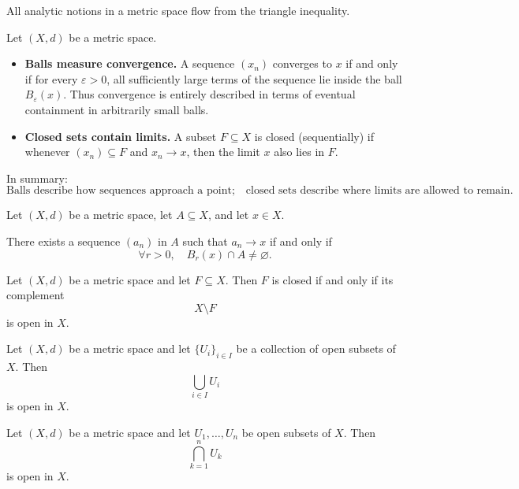 All analytic notions in a metric space flow from the
triangle inequality.


\begin{remark}
Let $(X,d)$ be a metric space.

\begin{itemize}
    \item \textbf{Balls measure convergence.}
    A sequence $(x_n)$ converges to $x$ if and only if
    for every $\varepsilon > 0$, all sufficiently large terms
    of the sequence lie inside the ball $B_\varepsilon(x)$.
    Thus convergence is entirely described in terms of
    eventual containment in arbitrarily small balls.

    \item \textbf{Closed sets contain limits.}
    A subset $F \subseteq X$ is closed (sequentially) if
    whenever $(x_n) \subseteq F$ and $x_n \to x$,
    then the limit $x$ also lies in $F$.
\end{itemize}

\noindent
In summary:
\[
\text{Balls describe how sequences approach a point;}
\quad
\text{closed sets describe where limits are allowed to remain.}
\]
\end{remark}

\begin{theorem}
Let $(X,d)$ be a metric space, let $A \subseteq X$,
and let $x \in X$.

There exists a sequence $(a_n)$ in $A$ such that
$a_n \to x$ if and only if
\[
\forall r > 0,\quad B_r(x) \cap A \neq \varnothing.
\]
\end{theorem}





\begin{theorem}
Let $(X,d)$ be a metric space and let $F \subseteq X$.
Then $F$ is closed if and only if its complement
\[
X \setminus F
\]
is open in $X$.
\end{theorem}


\begin{theorem}
Let $(X,d)$ be a metric space and let $\{U_i\}_{i \in I}$
be a collection of open subsets of $X$.
Then
\[
\bigcup_{i \in I} U_i
\]
is open in $X$.
\end{theorem}

\begin{theorem}
Let $(X,d)$ be a metric space and let $U_1,\dots,U_n$
be open subsets of $X$.
Then
\[
\bigcap_{k=1}^{n} U_k
\]
is open in $X$.
\end{theorem}



